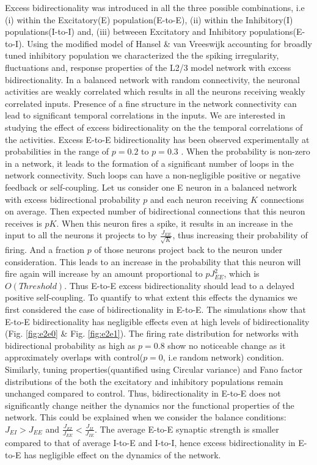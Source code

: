 Excess bidirectionality was introduced in all the three possible combinations, i.e (i) within the Excitatory(E) population(E-to-E), (ii) within the Inhibitory(I) populations(I-to-I) and, (iii) betweeen Excitatory and Inhibitory populations(E-to-I). Using the modified model of Hansel \& van Vreeswijk accounting for broadly tuned inhibitory population we characterized the the spiking irregularity, fluctuations and, response properties of the L2/3 model network with excess bidirectionality. 
In a balanced network with random connectivity, the neuronal activities are weakly correlated which results in all the neurons receiving weakly correlated inputs. Presence of a fine structure in the network connectivity can lead to significant temporal correlations in the inputs. We are interested in studying the effect of excess bidirectionality on the the temporal correlations of the activities. Excess E-to-E bidirectionality has been observed experimentally at probabilities in the range of $p = 0.2$ to $p = 0.3$ \cite{Song2005}. When the probability is non-zero in a network, it leads to the formation of a significant number of loops in the network connectivity. Such loops can have a non-negligible positive or negative feedback or self-coupling. Let us consider one E neuron in a balanced network with excess bidirectional probability $p$ and each neuron receiving $K$ connections on average. Then expected number of bidirectional connections that this neuron receives is $pK$. When this neuron fires a spike, it results in an increase in the input to all the neurons it projects to by $\frac{J_{EE}}{\sqrt{K}}$, thus increasing their probability of firing. And a fraction $p$ of those neurons project back to the neuron under consideration. This leads to an increase in the probability that this neuron will fire again will increase by an amount proportional to $p J_{EE}^{2}$, which is $O(Threshold)$.  Thus E-to-E excess bidirectionality should lead to a delayed positive self-coupling. To quantify to what extent this effects the dynamics we first considered the case of bidirectionality in E-to-E. The simulations show that E-to-E bidirectionality has negligible effects even at high levels of bidirectionality (Fig. \ref{fig:e2e0} \& Fig. \ref{fig:e2e1}). The firing rate distribution for networks with bidirectional probability as high as $p = 0.8$ show no noticeable change as it approximately overlaps with control($p = 0$, i.e random network) condition. Similarly, tuning properties(quantified using Circular variance) and Fano factor distributions of the both the excitatory and inhibitory populations remain unchanged compared to control. Thus, bidirectionality in E-to-E does not significantly change neither the dynamics nor the functional properties of the network. This could be explained when we consider the balance conditions: $J_{EI} > J_{EE}$ and $\frac{J_{EI}}{J_{EE}} < \frac{J_{II}}{J_{IE}}$. The average E-to-E synaptic strength is smaller compared to that of average I-to-E  and I-to-I, hence excess bidirectionality in E-to-E has negligible effect on the dynamics of the network. \\

